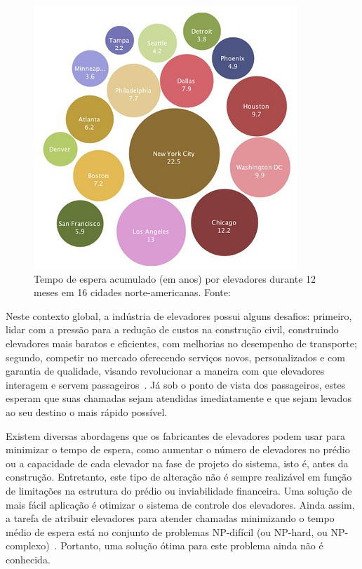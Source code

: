 \begin{figure}[htb!]
\centering\includegraphics{img/time-cost.jpg}
\caption{\label{fig:fig1}Tempo de espera acumulado (em anos) por elevadores durante 12 meses em 16 cidades norte-americanas. Fonte:~\cite{IBM10}}
\end{figure}

Neste contexto global, a indústria de elevadores possui alguns desafios: primeiro, lidar com a pressão para a redução de custos na construção civil, construindo elevadores mais baratos e eficientes, com melhorias no desempenho de transporte; segundo, competir no mercado oferecendo serviços novos, personalizados e com garantia de qualidade, visando revolucionar a maneira com que elevadores interagem e servem passageiros~\cite{KOEHLEROTTIGER02}. Já sob o ponto de vista dos passageiros, estes esperam que suas chamadas sejam atendidas imediatamente e que sejam levados ao seu destino o mais rápido possível.

Existem diversas abordagens que os fabricantes de elevadores podem usar para minimizar o tempo de espera, como aumentar o número de elevadores no prédio ou a capacidade de cada elevador na fase de projeto do sistema, isto é, antes da construção. Entretanto, este tipo de alteração não é sempre realizável em função de limitações na estrutura do prédio ou inviabilidade financeira. Uma solução de mais fácil aplicação é otimizar o sistema de controle dos elevadores. Ainda assim, a tarefa de atribuir elevadores para atender chamadas minimizando o tempo médio de espera está no conjunto de problemas NP-difícil (ou NP-hard, ou NP-complexo)~\cite{SeKo99}. Portanto, uma solução ótima para este problema ainda não é conhecida.

